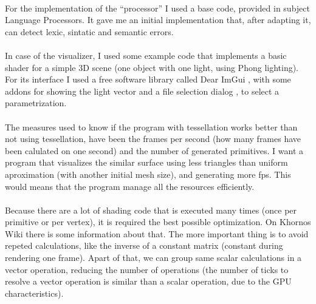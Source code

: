 \\For the implementation of the ``processor'' I used a base code, provided in subject Language Processors. It gave me an initial implementation that, after adapting it, can detect lexic, sintatic and semantic errors.\\
\\In case of the visualizer, I used some example code that implements a basic shader for a simple $3$D scene (one object with one light, using Phong lighting). For its interface I used a free software library called Dear ImGui \cite{DearImGui}, with some addons for showing the light vector \cite{LVector} and a file selection dialog \cite{Dialog}, to select a parametrization.\\
\\The measures used to know if the program with tessellation works better than not using tessellation, have been the frames per second (how many frames have been calulated on one second) and the number of generated primitives. I want a program that visualizes the similar surface using less triangles than uniform aproximation (with another initial mesh size), and generating more fps. This would means that the program manage all the resources efficiently.\\
\\Because there are a lot of shading code that is executed many times (once per primitive or per vertex), it is required the best possible optimization. On Khornos Wiki \cite{KhronosWiki} there is some information about that. The more important thing is to avoid repeted calculations, like the inverse of a constant matrix (constant during rendering one frame). Apart of that, we can group same scalar calculations in a vector operation, reducing the number of operations (the number of ticks to resolve a vector operation is similar than a scalar operation, due to the GPU characteristics).\\


